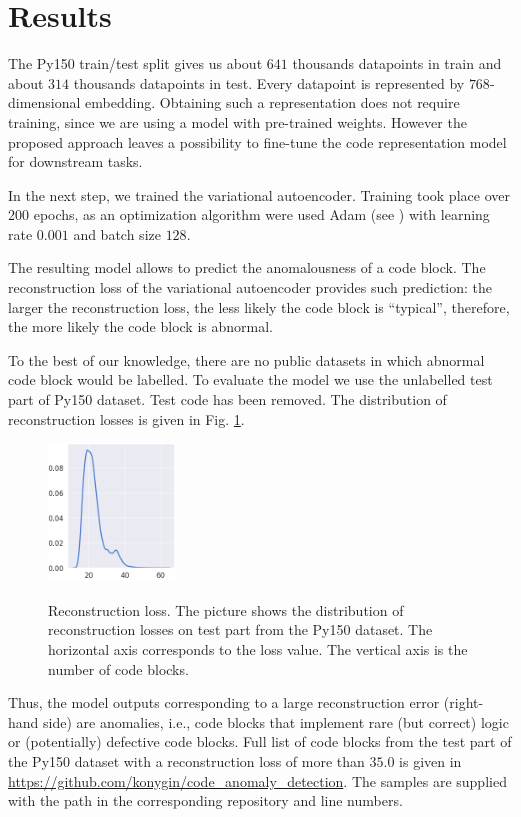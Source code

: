 \documentclass[conference]{ieeetran}
\begin{document}
\section{Results}\label{results}

The Py150 train/test split gives us about $641$ thousands datapoints in train and about $314$ thousands datapoints in test.
Every datapoint is represented by $768$-dimensional embedding.
Obtaining such a representation does not require training, since we are using a model with pre-trained weights. 
However the proposed approach leaves a possibility to fine-tune the code representation model for downstream tasks.

In the next step, we trained the variational autoencoder.
Training took place over $200$ epochs, as an optimization algorithm were used Adam (see \cite{KingmaBa2015}) with learning rate $0.001$ 
and batch size $128$.

The resulting model allows to predict the anomalousness of a code block.
The reconstruction loss of the variational autoencoder provides such prediction:
the larger the reconstruction loss, the less likely the code block  is ``typical'',
 therefore, the more likely the code block is abnormal.

To the best of our knowledge, there are no public datasets in which abnormal code block would be labelled. 
To evaluate the model we use the unlabelled test part of Py150 dataset.
Test code has been removed.
The distribution of reconstruction losses is given in Fig. \ref{reconstruction_loss}. 

\begin{figure}[htbp]
\caption{Reconstruction loss.
The picture shows the distribution of reconstruction losses on test part from the Py150 dataset.
The horizontal axis corresponds to the loss value.
The vertical axis is the number of code blocks.}
\centering
\includegraphics[width=0.3\textwidth]{reconstruction_loss}
\label{reconstruction_loss}
\end{figure}

Thus, the model outputs corresponding to a large reconstruction error (right-hand side) are anomalies,
 i.e., code blocks that implement rare (but correct) logic
 or (potentially) defective code blocks.
Full list of code blocks from the test part of the Py150 dataset with a reconstruction loss of more than $35.0$
 is given in \url{https://github.com/konygin/code_anomaly_detection}.
The samples are supplied with the path in the corresponding repository and line numbers.
\end{document}
